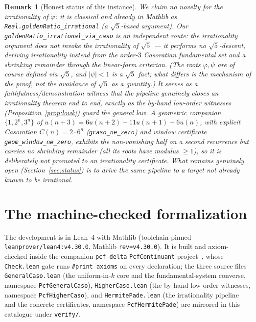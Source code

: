 \documentclass[11pt]{article}
\newtheorem{remark}[theorem]{Remark}
\newcommand{\Caso}{C}
\begin{document}
\begin{remark}[Honest status of this instance]\label{rem:honest-phi}
We claim \emph{no} novelty for the irrationality of $\varphi$: it is classical and
already in Mathlib as \texttt{Real.goldenRatio\_irrational} (a $\sqrt5$-based argument).
Our \texttt{goldenRatio\_irrational\_via\_caso} is an \emph{independent route}: the
\emph{irrationality argument} does not invoke the irrationality of $\sqrt5$ --- it
performs no $\sqrt5$-descent, deriving irrationality instead from the order-$3$
Casoratian fundamental set and a shrinking remainder through the linear-form criterion.
(The roots $\varphi,\psi$ are of course \emph{defined} via $\sqrt5$, and $|\psi|<1$ is a
$\sqrt5$ fact; what differs is the \emph{mechanism} of the proof, not the avoidance of
$\sqrt5$ as a quantity.) It serves as a
\emph{faithfulness/demonstration witness} that the pipeline genuinely closes an
irrationality theorem end to end, exactly as the by-hand low-order witnesses
(Proposition~\ref{prop:lowk}) guard the general law. A geometric companion
$\{1,2^n,3^n\}$ of $u(n+3)=6u(n+2)-11u(n+1)+6u(n)$, with explicit Casoratian
$\Caso(n)=2\cdot6^n$ (\texttt{gcaso\_ne\_zero}) and window certificate
\texttt{geom\_window\_ne\_zero}, exhibits the non-vanishing half on a second recurrence
but carries \emph{no} shrinking remainder (all its roots have modulus $\ge1$), so it is
deliberately \emph{not} promoted to an irrationality certificate. What remains genuinely
open (Section~\ref{sec:status}) is to drive the same pipeline to a target \emph{not}
already known to be irrational.
\end{remark}

\section{The machine-checked formalization}\label{sec:lean}

The development is in Lean~4 with Mathlib (toolchain pinned
\texttt{leanprover/lean4:v4.30.0}, Mathlib \texttt{rev=v4.30.0}). It is built and
axiom-checked inside the companion \texttt{pcf-delta} \texttt{PcfContinuant}
project~\cite{pcfdelta}, whose \texttt{Check.lean} gate runs \texttt{\#print axioms}
on every declaration; the three source files \texttt{GeneralCaso.lean} (the
uniform-in-$k$ core and the fundamental-system converse, namespace
\texttt{PcfGeneralCaso}), \texttt{HigherCaso.lean} (the by-hand low-order witnesses,
namespace \texttt{PcfHigherCaso}), and \texttt{HermitePade.lean} (the irrationality
pipeline and the concrete certificates, namespace \texttt{PcfHermitePade}) are mirrored
in this catalogue under \texttt{verify/}.
\end{document}
